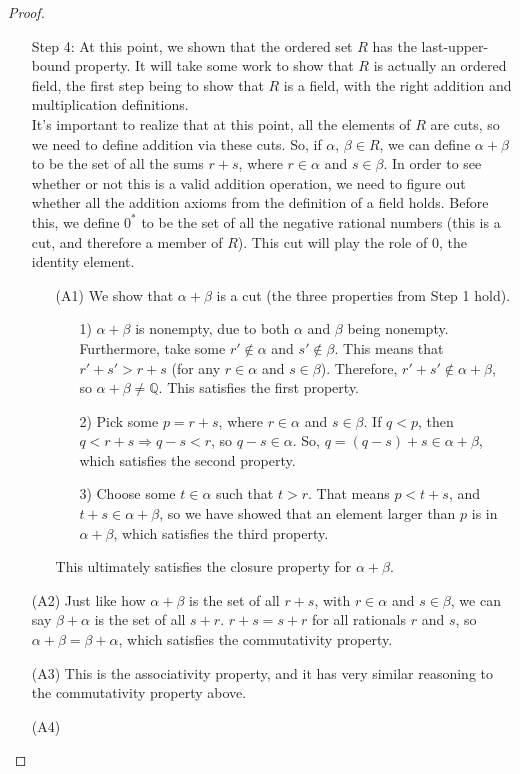 \documentclass{article}
\theoremstyle{definition}
\begin{document}
\begin{section}
\begin{proof}
\begin{enumerate}
\item[Step 4:] At this point, we shown that the ordered set $R$ has the last-upper-bound property. It will take some work to show that $R$ is actually an ordered field, the first step being to show that $R$ is a field, with the right addition and multiplication definitions. \\
It's important to realize that at this point, all the elements of $R$ are cuts, so we need to define addition via these cuts. So, if $\alpha$, $\beta \in R$, we can define $\alpha + \beta$ to be the set of all the sums $r+s$, where $r \in \alpha$ and $s \in \beta$. In order to see whether or not this is a valid addition operation, we need to figure out whether all the addition axioms from the definition of a field holds. Before this, we define $0^*$ to be the set of all the negative rational numbers (this is a cut, and therefore a member of $R$). This cut will play the role of $0$, the identity element. 
\begin{enumerate}
\item[(A1)] We show that $\alpha + \beta$ is a cut (the three properties from Step 1 hold). 
\begin{enumerate}
\item[1)] $\alpha + \beta$ is nonempty, due to both $\alpha$ and $\beta$ being nonempty. Furthermore, take some $r' \not\in\alpha$ and $s'\not\in\beta$. This means that $r' + s' > r + s$ (for any $r \in \alpha$ and $s \in \beta$). Therefore, $r' + s' \not\in \alpha + \beta$, so $\alpha + \beta \neq \mathbb{Q}$. This satisfies the first property. \checkmark \\
\item[2)] Pick some $p = r + s$, where $r \in \alpha$ and $s \in \beta$. If $q < p$, then $q < r + s \Rightarrow q - s < r$, so $q-s \in \alpha$. So, $q = (q-s) + s \in \alpha + \beta$, which satisfies the second property. \checkmark \\
\item[3)] Choose some $t \in \alpha$ such that $t > r$. That means $p < t + s$, and $t+s \in \alpha + \beta$, so we have showed that an element larger than $p$ is in $\alpha + \beta$, which satisfies the third property. \checkmark 
\end{enumerate}
This ultimately satisfies the closure property for $\alpha + \beta$.
\end{enumerate}
\item[(A2)] Just like how $\alpha + \beta$ is the set of all $r+s$, with $r \in\alpha$ and $s\in\beta$, we can say $\beta + \alpha$ is the set of all $s+r$. $r+s=s+r$ for all rationals $r$ and $s$, so $\alpha + \beta = \beta + \alpha$, which satisfies the commutativity property.
\item[(A3)] This is the associativity property, and it has very similar reasoning to the commutativity property above.
\item[(A4)] 
\end{enumerate}
\end{proof}
\end{section}

 
 
 
\end{document}
